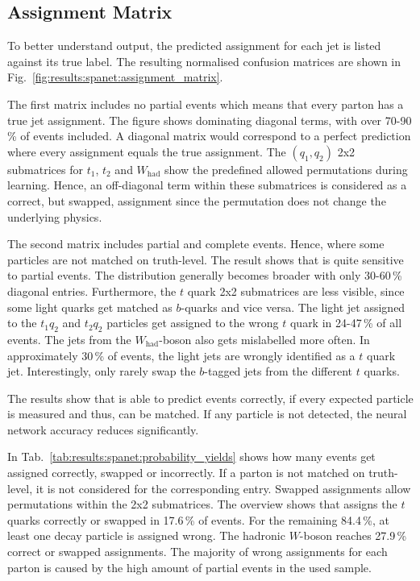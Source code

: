 \documentclass[bachelor,ngerman,english]{GAUBM}
\begin{document}
\subsection*{Assignment Matrix}
To better understand \spanets output, the predicted assignment for each jet is listed against its true label. The resulting normalised confusion matrices are shown in Fig.~\ref{fig:results:spanet:assignment_matrix}. 

The first matrix includes no partial events which means that every parton has a true jet assignment. The figure shows dominating diagonal terms, with over 70-90\,\% of events included. A diagonal matrix would correspond to a perfect prediction where every \spanet assignment equals the true assignment. The $(q_1,q_2)$ 2x2 submatrices for $t_1$, $t_2$ and $W_\text{had}$ show the predefined allowed permutations during learning. Hence, an off-diagonal term within these submatrices is considered as a correct, but swapped, assignment since the permutation does not change the underlying physics.

The second matrix includes partial and complete events. Hence, where some particles are not matched on truth-level. The result shows that \spanet is quite sensitive to partial events. The distribution generally becomes broader with only 30-60\,\% diagonal entries. Furthermore, the $t$ quark 2x2 submatrices are less visible, since some light quarks get matched as $b$-quarks and vice versa. The light jet assigned to the $t_1q_2$ and $t_2q_2$ particles get assigned to the wrong $t$ quark in 24-47\,\% of all events. The jets from the $W_\text{had}$-boson also gets mislabelled more often. In approximately 30\,\% of events, the light jets are wrongly identified as a $t$ quark jet. Interestingly, \spanet only rarely swap the $b$-tagged jets from the different $t$ quarks.

The results show that \spanet is able to predict events correctly, if every expected particle is measured and thus, can be matched. If any particle is not detected, the neural network accuracy reduces significantly. 

In Tab.~\ref{tab:results:spanet:probability_yields} shows how many events get assigned correctly, swapped or incorrectly. If a parton is not matched on truth-level, it is not considered for the corresponding entry. Swapped assignments allow permutations within the 2x2 submatrices. The overview shows that \spanet assigns the $t$ quarks correctly or swapped in 17.6\,\% of events. For the remaining 84.4\,\%, at least one decay particle is assigned wrong. The hadronic $W$-boson reaches 27.9\,\% correct or swapped assignments. The majority of wrong assignments for each parton is caused by the high amount of partial events in the used sample.
\end{document}
